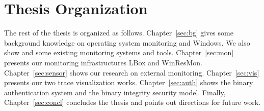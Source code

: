 \section{Thesis Organization}
\label{sec:outline}

The rest of the thesis is organized as follows.
Chapter~\ref{sec:bg} gives some background knowledge on operating
system monitoring and Windows.
We also show and some existing monitoring systems and tools.
Chapter~\ref{sec:mon} presents our monitoring infrastructures LBox
and WinResMon.
Chapter~\ref{sec:sensor} shows our research on external monitoring.
Chapter~\ref{sec:vis} presents our two trace visualization works.
Chapter~\ref{sec:auth} shows the binary authentication system and
the binary integrity security model.
Finally, Chapter~\ref{sec:concl} concludes the thesis and points out
directions for future work.
